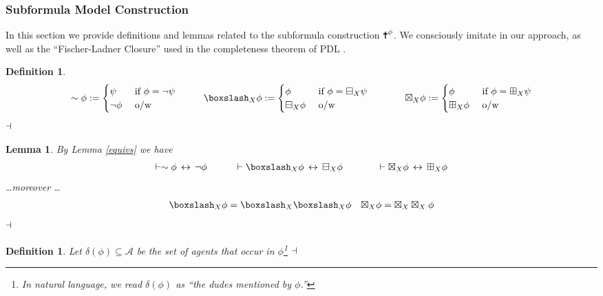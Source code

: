 \documentclass[11pt]{article}
\numberwithin{equation}{subsection}
\newtheorem{mydef}[theorem]{Definition}
\newtheorem{lemma}[theorem]{Lemma}
\renewcommand{\Cross}{\textrm{\ding{61}}}
\newcommand{\BB}{\boxminus}
\newcommand{\pBB}{\boxslash}
\newcommand{\BBI}{\boxplus}
\newcommand{\pBBI}{\boxtimes}
\begin{document}
\subsubsection{Subformula Model Construction}
In this section we provide definitions and lemmas related to the subformula construction $\Cross^\phi$.  We consciously imitate \citet{boolos1993logic} in our approach, as well as the ``Fischer-Ladner Closure'' used in the completeness theorem of PDL \citep{blackburn2001modal}.
\begin{mydef}
\begin{eqnarray*}
\sim \phi := \begin{cases} \psi &\textup{ if $\phi = \neg\psi$} \\ \neg \phi & \textup{ o/w} \end{cases} &
\hspace{1cm} \pBB_X \phi := \begin{cases} \phi &\textup{ if $\phi = \BB_X \psi$} \\ \BB_X \phi & \textup{ o/w} \end{cases} \hspace{1cm} &
\pBBI_X \phi := \begin{cases} \phi &\textup{ if $\phi = \BBI_X \psi$} \\ \BBI_X \phi & \textup{ o/w} \end{cases}
\end{eqnarray*}
$\hfill\dashv$\end{mydef}
\begin{lemma}\label{equivs2} By Lemma \ref{equivs} we have
\begin{eqnarray*} 
\vdash \sim \phi \IFF \neg \phi &
\hspace{1cm} \vdash \pBB_X \phi \IFF \BB_X \phi \hspace{1cm} &
\vdash \pBBI_X \phi \IFF \BBI_X \phi
\end{eqnarray*}
\ldots moreover \ldots 
\begin{align*}
\pBB_X \phi = \pBB_X\pBB_X \phi & & \pBBI_X\phi = \pBBI_X \pBBI_X \phi \hfill
\end{align*}
$\hfill\dashv$\end{lemma}
\begin{mydef} Let $\delta(\phi) \subseteq \mathcal{A}$ be the set of agents that occur in $\phi$\footnote{In natural language, we read $\delta(\phi)$ as ``the dudes mentioned by $\phi$.''} $\hfill\dashv$\end{mydef}
\end{document}
